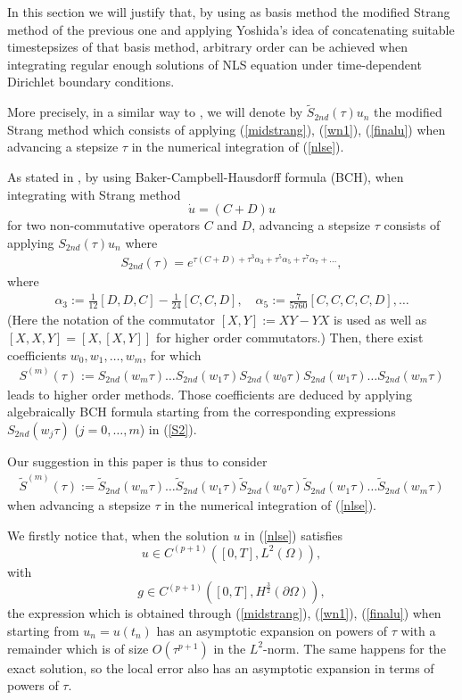 \documentclass[a4paper,12pt]{article}
\begin{document}
In this section we will justify that, by using as basis method the modified Strang method of the previous one and applying Yoshida's idea \cite{Y} of concatenating suitable timestepsizes of that basis method, arbitrary order can be achieved when integrating regular enough solutions of NLS equation under time-dependent Dirichlet boundary conditions.

More precisely, in a similar way to \cite{Y}, we will denote by $\tilde{S}_{2nd}(\tau)u_n$ the modified Strang method which consists of applying (\ref{midstrang}), (\ref{wn1}), (\ref{finalu}) when advancing a stepsize $\tau$ in the numerical integration of (\ref{nlse}).

As stated in \cite{Y}, by using Baker-Campbell-Hausdorff formula (BCH), when integrating with Strang method
$$
\dot{u}=(C+D)u$$
for two non-commutative operators $C$ and $D$,  advancing a stepsize $\tau$ consists of applying $S_{2nd}(\tau)u_n$ where
\begin{eqnarray}
S_{2nd}(\tau)=e^{\tau(C+D)+\tau^3 \alpha_3+\tau^5 \alpha_5+\tau^7 \alpha_7+\dots},
\label{S2}
\end{eqnarray}
where
\begin{eqnarray}
\alpha_3:= \frac{1}{12}[D,D,C]-\frac{1}{24}[C,C,D], \quad \alpha_5:= \frac{7}{5760}[C,C,C,C,D], \dots
\label{alphas}
\end{eqnarray}
(Here the notation of the commutator $[X,Y]:=XY-YX$ is used as well as $[X,X,Y]=[X,[X,Y]]$ for higher order commutators.) Then, there exist coefficients $w_0,w_1,\dots,w_m$, for which
\begin{eqnarray}
S^{(m)}(\tau):= S_{2nd}(w_m \tau)\dots S_{2nd}(w_1 \tau)S_{2nd}(w_0 \tau)S_{2nd}(w_1 \tau)\dots S_{2nd}(w_m \tau)
\label{Sm}
\end{eqnarray}
leads to higher order methods. Those coefficients are deduced by applying algebraically  BCH formula starting from the corresponding expressions $S_{2nd}(w_j \tau)$ ($j=0,\dots,m$) in (\ref{S2}).

Our suggestion in this paper is thus to consider
\begin{eqnarray}
\tilde{S}^{(m)}(\tau):= \tilde{S}_{2nd}(w_m \tau)\dots \tilde{S}_{2nd}(w_1 \tau)\tilde{S}_{2nd}(w_0 \tau)\tilde{S}_{2nd}(w_1 \tau)\dots \tilde{S}_{2nd}(w_m \tau)
\label{Stildem}
\end{eqnarray}
when advancing a stepsize $\tau$ in the numerical integration of (\ref{nlse}).

We firstly notice that, when the solution $u$ in (\ref{nlse}) satisfies
$$
u\in C^{(p+1)}([0,T],L^2(\Omega)),
$$
with
$$
g\in C^{(p+1)}([0,T],H^{\frac{3}{2}}(\partial \Omega)),
$$
the expression which is obtained through (\ref{midstrang}), (\ref{wn1}), (\ref{finalu}) when starting from $u_n=u(t_n)$ has an asymptotic expansion on powers of $\tau$ with a remainder which is of size $O(\tau^{p+1})$ in the $L^2$-norm.
The same happens for the exact solution, so the local error also has an asymptotic expansion in terms of powers of $\tau$.
\end{document}

